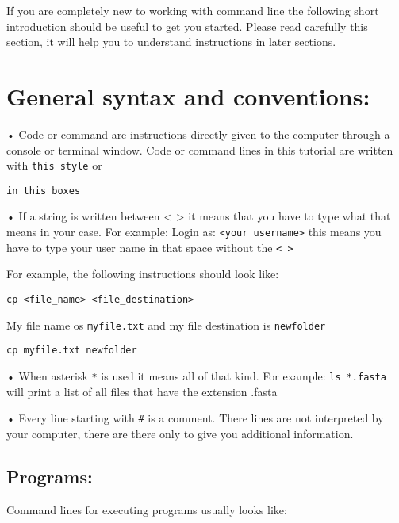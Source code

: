 \documentclass[
]{book}
\begin{document}
If you are completely new to working with command line the following short introduction should be useful to get you started. Please read carefully this section, it will help you to understand instructions in later sections.

\hypertarget{general-syntax-and-conventions}{%
\section{General syntax and conventions:}\label{general-syntax-and-conventions}}

• Code or command are instructions directly given to the computer through a console or terminal window. Code or command lines in this tutorial are written with \texttt{this\ style} or

\begin{verbatim}
in this boxes
\end{verbatim}

• If a string is written between \textless{} \textgreater{} it means that you have to type what that means in your case. For example: Login as: \texttt{\textless{}your\ username\textgreater{}} this means you have to type your user name in that space without the \texttt{\textless{}\ \textgreater{}}

For example, the following instructions should look like:

\begin{verbatim}
cp <file_name> <file_destination>
\end{verbatim}

My file name os \texttt{myfile.txt} and my file destination is \texttt{newfolder}

\begin{verbatim}
cp myfile.txt newfolder
\end{verbatim}

• When asterisk \texttt{*} is used it means all of that kind. For example: \texttt{ls\ *.fasta} will print a list of all files that have the extension .fasta

• Every line starting with \texttt{\#} is a comment. There lines are not interpreted by your computer, there are there only to give you additional information.

\hypertarget{programs}{%
\subsection{Programs:}\label{programs}}

Command lines for executing programs usually looks like:
\end{document}
